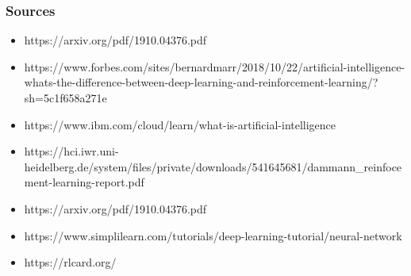 \begin{frame}
    \frametitle{Sources}
    \begin{itemize}
        \item https://arxiv.org/pdf/1910.04376.pdf
        \item https://www.forbes.com/sites/bernardmarr/2018/10/22/artificial-intelligence-whats-the-difference-between-deep-learning-and-reinforcement-learning/?sh=5c1f658a271e
        \item https://www.ibm.com/cloud/learn/what-is-artificial-intelligence
        \item https://hci.iwr.uni-heidelberg.de/system/files/private/downloads/541645681/dammann\_reinfocement-learning-report.pdf
        \item https://arxiv.org/pdf/1910.04376.pdf
        \item https://www.simplilearn.com/tutorials/deep-learning-tutorial/neural-network
        \item https://rlcard.org/
    \end{itemize}
\end{frame}
